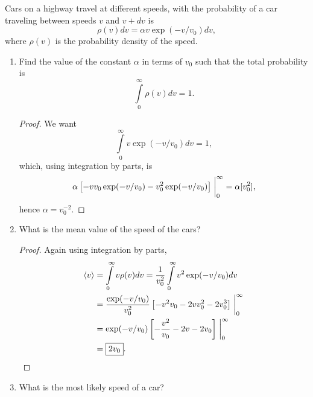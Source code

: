 \documentclass[12pt]{article}
\newenvironment{problem}[2][Problem]{\begin{trivlist}
    \item[\hskip \labelsep {\bfseries #1}\hskip \labelsep {\bfseries #2.}]}{\end{trivlist}}
\theoremstyle{definition}
\begin{document}
\begin{problem}{2}
  Cars on a highway travel at different speeds, with the probability of a car traveling between speeds \( v \) and \( v + dv \) is
  \begin{equation}
  \label{eq:1}
  \rho(v) dv = \alpha v \exp(-v/v_0) dv,
  \end{equation}
  where \( \rho(v) \) is the probability density of the speed.

  \begin{enumerate}[label=(\alph*)]
    \item Find the value of the constant \(\alpha\) in terms of \( v_0 \) such that the total probability is
          \begin{equation}
          \label{eq:2}
          \int\limits_0^{\infty}\rho(v) dv = 1.
          \end{equation}
          \begin{proof}
            We want
            \begin{equation}
            \label{eq:6}
            \int\limits_0^{\infty} v \exp(-v/v_0) dv = 1,
            \end{equation}
            which, using integration by parts, is
            \begin{equation}
            \label{eq:7}
            \alpha\left[-vv_0\exp(-v/v_0) - v_0^2\exp(-v/v_0)\right]\eval_0^{\infty} = \alpha[v_0^{2}],
            \end{equation}
            hence \(\boxed{\alpha = v_0^{-2}}\).
          \end{proof}
    \item What is the mean value of the speed of the cars?
          \begin{proof}
          Again using integration by parts,
          \begin{align}
            \langle v \rangle &= \int\limits_0^{\infty} v \rho(v) dv = \frac{1}{v_{0}^2}\int\limits_0^{\infty} v^2 \exp(-v/v_0) dv \\
                  &= \frac{\exp(-v/v_0)}{v_0^2} \left[ -v^2v_0 - 2vv_0^2 - 2v_0^3 \right] \eval_0^{\infty} \\
                  &= \exp(-v/v_0) \left[ -\frac{v^2}{v_0} - 2v - 2v_0 \right] \eval_0^{\infty} \\
            & = \boxed{2v_0}.
          \end{align}
          \end{proof}
    \item What is the most likely speed of a car?

\end{enumerate}
\end{problem}
\end{document}
